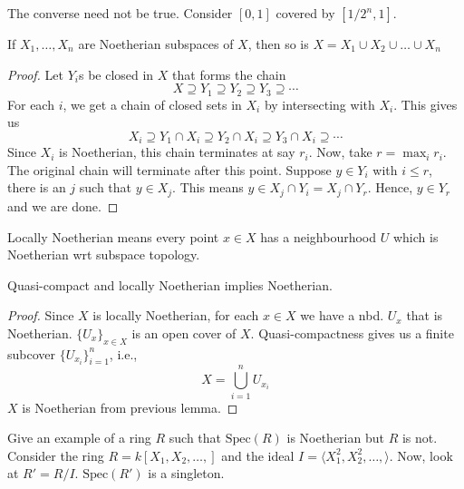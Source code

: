 \documentclass[oneside, 12pt, ]{scrbook}
\newcommand{\spec}{\mathrm{Spec}}
\theoremstyle{theorem}
\begin{document}
\begin{remark}
The converse need not be true. Consider $[0,1]$ covered by $[1/2^n , 1]$.
\end{remark}

\begin{lemma}
If $X_{1}, \hdots , X_{n}$ are Noetherian subspaces of $X$, then so is $X=X_{1} \cup X_{2} \cup \hdots \cup X_{n}$
\end{lemma}

\begin{proof}
Let $Y_{i}$s be closed in $X$ that forms the chain $$X \supseteq Y_{1} \supseteq Y_{2} \supseteq Y_{3} \supseteq \cdots $$ For each $i$, we get a chain of closed sets in $X_{i}$ by intersecting with $X_{i}$. This gives us $$X_{i} \supseteq Y_{1}\cap X_{i} \supseteq Y_{2}\cap X_{i} \supseteq Y_{3}\cap X_{i} \supseteq \cdots $$ Since $X_{i}$ is Noetherian, this chain terminates at say $r_{i}$. Now, take $r = \max_{i} r_{i}$. The original chain will terminate after this point. Suppose $y \in Y_{i}$ with $i \le r$, there is an $j$ such that $y \in X_{j}$. This means $y \in X_{j} \cap Y_{i} = X_{j} \cap Y_{r}$. Hence, $y \in Y_{r}$ and we are done.
\end{proof}

\begin{definition}
Locally Noetherian means every point $x\in X$ has a neighbourhood $U$ which is Noetherian wrt subspace topology.
\end{definition}

\begin{lemma}
Quasi-compact and locally Noetherian implies Noetherian.
\end{lemma}

\begin{proof}
Since $X$ is locally Noetherian, for each $x\in X$ we have a nbd. $U_{x}$ that is Noetherian. $\{U_{x}\}_{x \in X}$ is an open cover of $X$. Quasi-compactness gives us a finite subcover $\{U_{x_{i}}\}_{i=1}^n$, i.e., $$X = \bigcup_{i=1}^n U_{x_{i}}$$ $X$ is Noetherian from previous lemma.
\end{proof}

\begin{exercise}
Give an example of a ring $R$ such that $\spec(R)$ is Noetherian but $R$ is not. \\

Consider the ring $R=k[X_{1}, X_{2}, \hdots , ]$ and the ideal $I = \langle X_{1}^2 , X_{2}^2 , \hdots , \rangle$. Now, look at $R'=R/I$. $\spec(R')$ is a singleton. 
\end{exercise}
\end{document}
